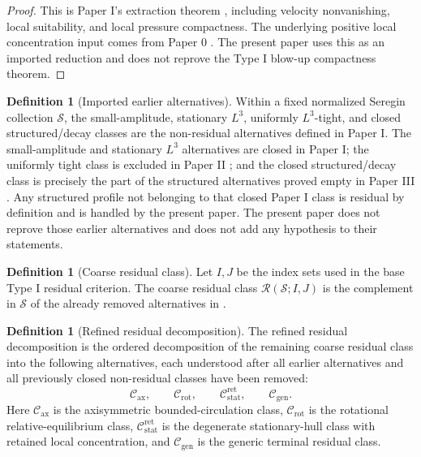 \documentclass[11pt]{amsart}
\numberwithin{equation}{section}
\theoremstyle{plain}
\theoremstyle{definition}
\newtheorem{definition}[theorem]{Definition}
\theoremstyle{remark}
\newcommand{\calS}{\mathcal S}
\newcommand{\calR}{\mathcal R}
\newcommand{\Cax}{\mathcal C_{\mathrm{ax}}}
\newcommand{\Crot}{\mathcal C_{\mathrm{rot}}}
\newcommand{\Cstat}{\mathcal C_{\mathrm{stat}}^{\mathrm{ret}}}
\newcommand{\Cgen}{\mathcal C_{\mathrm{gen}}}
\begin{document}
\begin{proof}
This is Paper I's extraction theorem \cite{DuranPaperI}, including velocity
nonvanishing, local suitability, and local pressure compactness.  The underlying
positive local concentration input comes from Paper 0 \cite{DuranPaper0}.  The
present paper uses this as an imported reduction and does not reprove the
Type I blow-up compactness theorem.
\end{proof}

\begin{definition}[Imported earlier alternatives]
\label{hyp:previous-nonresidual}
Within a fixed normalized Seregin collection \(\calS\), the small-amplitude,
stationary \(L^3\), uniformly \(L^3\)-tight, and closed structured/decay
classes are the non-residual alternatives defined in Paper I.  The
small-amplitude and stationary \(L^3\) alternatives are closed in Paper I; the
uniformly tight class is excluded in Paper II \cite{DuranPaperII}; and the
closed structured/decay class is precisely the part of the structured
alternatives proved empty in Paper III \cite{DuranPaperIII}.  Any
structured profile not belonging to that closed Paper I class is residual by
definition and is handled by the present paper.  The present paper does not
reprove those earlier alternatives and does not add any hypothesis to their
statements.
\end{definition}

\begin{definition}[Coarse residual class]
\label{def:coarse-residual}
Let \(I,J\) be the index sets used in the base Type I residual
criterion.  The coarse residual class
\(\calR(\calS;I,J)\) is the complement in \(\calS\) of the already removed
alternatives in .
\end{definition}

\begin{definition}[Refined residual decomposition]
\label{def:refined-decomposition}
The refined residual decomposition is the ordered decomposition of the remaining
coarse residual class into the following alternatives, each understood after
all earlier alternatives and all previously closed non-residual classes have
been removed:
\[
   \Cax,\qquad
   \Crot,\qquad
   \Cstat,\qquad
   \Cgen .
\]
Here \(\Cax\) is the axisymmetric bounded-circulation class, \(\Crot\) is the
rotational relative-equilibrium class, \(\Cstat\) is the degenerate
stationary-hull class with retained local concentration, and \(\Cgen\) is the
generic terminal residual class.
\end{definition}
\end{document}
